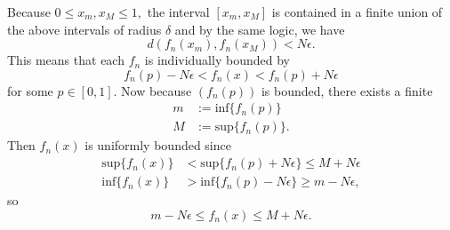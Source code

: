 \documentclass{article}
\numberwithin{equation}{section}
\begin{document}
\begin{enumerate}
\begin{enumerate}[label=(\alph*)]
        Because $0 \le x_m,x_M \le 1,$ the interval $[x_m,x_M]$ is contained in a finite union of the above intervals of radius $\delta$ and by the same logic, we have 
        \begin{equation}
            d(f_n(x_m), f_n(x_M)) < N\epsilon.
        \end{equation}
        This means that each $f_n$ is individually bounded by 
        \begin{equation}
            f_n(p) - N\epsilon < f_n(x) < f_n(p) + N\epsilon
        \end{equation}
        for some $p\in [0,1].$ Now because $(f_n(p))$ is bounded, there exists a finite 
        \begin{align}
            m &:= \text{inf}\{f_n(p)\} \\ 
            M &:= \text{sup}\{f_n(p)\}.
        \end{align}
        Then $f_n(x)$ is uniformly bounded since 
        \begin{align}
            \text{sup}\{f_n(x)\} &< \text{sup}\{f_n(p) + N\epsilon\} \le M + N\epsilon \\ 
            \text{inf}\{f_n(x)\} &> \text{inf}\{f_n(p) - N\epsilon\}  \ge m - N\epsilon,
        \end{align}
        so 
        \begin{equation}
            m - N\epsilon \le f_n(x) \le M + N\epsilon.
        \end{equation}

\end{enumerate}
\end{enumerate}
\end{document}
